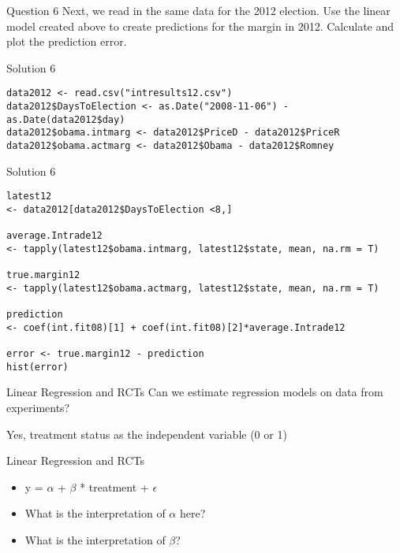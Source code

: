 \documentclass[presentation]{beamer}
\begin{document}
\begin{frame}[label={sec:org82f7dc2}]{Question 6}
Next, we read in the same data for the 2012 election. Use the linear model created above to create predictions for the margin in 2012. Calculate and plot the prediction error.
\end{frame}

\begin{frame}[fragile,shrink=25,label={sec:org18f3046}]{Solution 6}
 \begin{verbatim}
data2012 <- read.csv("intresults12.csv")
data2012$DaysToElection <- as.Date("2008-11-06") - as.Date(data2012$day)
data2012$obama.intmarg <- data2012$PriceD - data2012$PriceR
data2012$obama.actmarg <- data2012$Obama - data2012$Romney
\end{verbatim}
\end{frame}


\begin{frame}[fragile,shrink=25,label={sec:org6df5d16}]{Solution 6}
 \begin{verbatim}
latest12
<- data2012[data2012$DaysToElection <8,]

average.Intrade12
<- tapply(latest12$obama.intmarg, latest12$state, mean, na.rm = T)

true.margin12
<- tapply(latest12$obama.actmarg, latest12$state, mean, na.rm = T)

prediction
<- coef(int.fit08)[1] + coef(int.fit08)[2]*average.Intrade12

error <- true.margin12 - prediction
hist(error)
\end{verbatim}
\end{frame}


\begin{frame}[label={sec:org6cab27f}]{Linear Regression and RCTs}
Can we estimate regression models on data from experiments?

\pause

\alert{Yes, treatment status as the independent variable (0 or 1)}
\end{frame}



\begin{frame}[label={sec:orgea6265f}]{Linear Regression and RCTs}
\begin{itemize}
\item y = \(\alpha\) + \(\beta\) * treatment + \(\epsilon\)
\end{itemize}


\begin{itemize}
\item What is the interpretation of \(\alpha\) here?
\end{itemize}

\pause

\begin{itemize}
\item What is the interpretation of \(\beta\)?
\end{itemize}
\end{frame}
\end{document}

